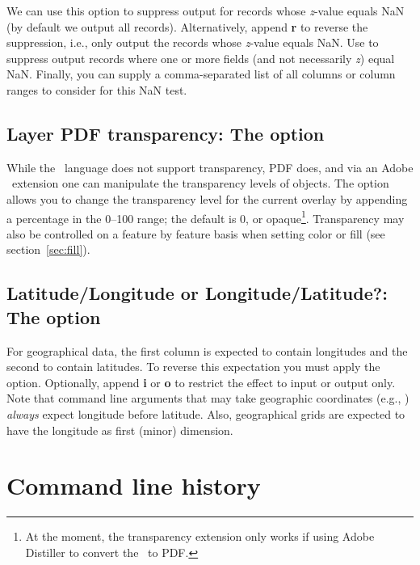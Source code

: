 We can use this option to suppress output for records whose \emph{z}-value equals NaN
(by default we output all records).  Alternatively, append \textbf{r} to reverse the suppression,
i.e., only output the records whose \emph{z}-value equals NaN.  Use  to suppress
output records where one or more fields (and not necessarily \emph{z}) equal NaN.  Finally, you can supply
a comma-separated list of all columns or column ranges to consider for this NaN test.

\subsection{Layer PDF transparency: The  option}
\label{sec:ltransp}

While the \PS\ language does not support transparency, PDF does, and via an Adobe \PS\ extension
one can manipulate the transparency levels of objects.  The  option allows you to change
the transparency level for the current overlay by appending a percentage in the 0--100 range; the
default is 0, or opaque\footnote{At the moment, the transparency extension only works if
using Adobe Distiller to convert the \PS\ to PDF.}.  Transparency may also be controlled
on a feature by feature basis when setting color or fill (see section~\ref{sec:fill}).

\subsection{Latitude/Longitude or Longitude/Latitude?: The \Opt{:} option}

For geographical data, the first column is expected to contain longitudes
and the second to contain latitudes.  To reverse this expectation you must
apply the \Opt{:} option.  Optionally, append \textbf{i} or \textbf{o} to restrict
the effect to input or output only.  Note that command line arguments that may take
geographic coordinates (e.g., ) \emph{always} expect longitude before
latitude. Also, geographical grids are expected to have the longitude as
first (minor) dimension.

%

\section{Command line history}
\label{sec:gmtcommands}

